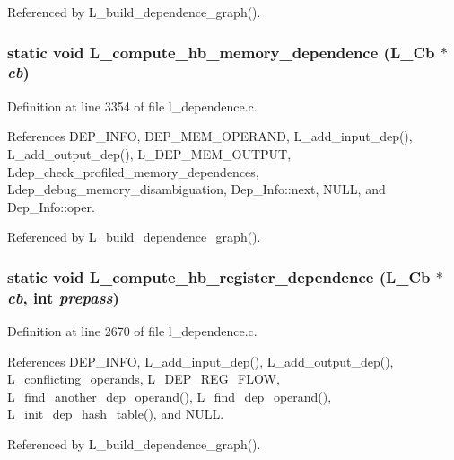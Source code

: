 Referenced by L\_\-build\_\-dependence\_\-graph().
\subsubsection{\setlength{\rightskip}{0pt plus 5cm}static void L\_\-compute\_\-hb\_\-memory\_\-dependence (L\_\-Cb $\ast$ {\em cb})\hspace{0.3cm}{\tt  [static]}}\label{l__dependence_8c_40faaf1cf134688037d4aca47f0c147e}




Definition at line 3354 of file l\_\-dependence.c.

References DEP\_\-INFO, DEP\_\-MEM\_\-OPERAND, L\_\-add\_\-input\_\-dep(), L\_\-add\_\-output\_\-dep(), L\_\-DEP\_\-MEM\_\-OUTPUT, Ldep\_\-check\_\-profiled\_\-memory\_\-dependences, Ldep\_\-debug\_\-memory\_\-disambiguation, Dep\_\-Info::next, NULL, and Dep\_\-Info::oper.

Referenced by L\_\-build\_\-dependence\_\-graph().
\subsubsection{\setlength{\rightskip}{0pt plus 5cm}static void L\_\-compute\_\-hb\_\-register\_\-dependence (L\_\-Cb $\ast$ {\em cb}, int {\em prepass})\hspace{0.3cm}{\tt  [static]}}\label{l__dependence_8c_59ec57ac8c9dda963160a4d9fac94c99}




Definition at line 2670 of file l\_\-dependence.c.

References DEP\_\-INFO, L\_\-add\_\-input\_\-dep(), L\_\-add\_\-output\_\-dep(), L\_\-conflicting\_\-operands, L\_\-DEP\_\-REG\_\-FLOW, L\_\-find\_\-another\_\-dep\_\-operand(), L\_\-find\_\-dep\_\-operand(), L\_\-init\_\-dep\_\-hash\_\-table(), and NULL.

Referenced by L\_\-build\_\-dependence\_\-graph().

